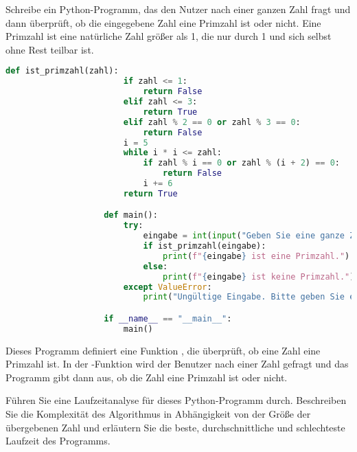 \documentclass[10pt]{article}
\begin{document}
    \spawncover

    \begin{task}[Primzahlüberprüfung]
        \begin{subtask}
            Schreibe ein Python-Programm, das den Nutzer nach einer ganzen Zahl fragt und dann überprüft, ob die eingegebene Zahl eine Primzahl ist oder nicht.
            Eine Primzahl ist eine natürliche Zahl grö{\ss}er als 1, die nur durch 1 und sich selbst ohne Rest teilbar ist.

            \begin{solution}
                \begin{lstlisting}[language= python]
                    def ist_primzahl(zahl):
                        if zahl <= 1:
                            return False
                        elif zahl <= 3:
                            return True
                        elif zahl % 2 == 0 or zahl % 3 == 0:
                            return False
                        i = 5
                        while i * i <= zahl:
                            if zahl % i == 0 or zahl % (i + 2) == 0:
                                return False
                            i += 6
                        return True

                    def main():
                        try:
                            eingabe = int(input("Geben Sie eine ganze Zahl ein: "))
                            if ist_primzahl(eingabe):
                                print(f"{eingabe} ist eine Primzahl.")
                            else:
                                print(f"{eingabe} ist keine Primzahl.")
                        except ValueError:
                            print("Ungültige Eingabe. Bitte geben Sie eine ganze Zahl ein.")

                    if __name__ == "__main__":
                        main()
                \end{lstlisting}
                Dieses Programm definiert eine Funktion , die überprüft, ob eine Zahl eine Primzahl ist.
                In der -Funktion wird der Benutzer nach einer Zahl gefragt und das Programm gibt dann aus, ob die Zahl eine Primzahl ist oder nicht.
            \end{solution}
        \end{subtask}

        \begin{subtask}
            Führen Sie eine Laufzeitanalyse für dieses Python-Programm durch.
            Beschreiben Sie die Komplexität des Algorithmus in Abhängigkeit von der Größe der übergebenen Zahl und erläutern Sie die beste, durchschnittliche und schlechteste Laufzeit des Programms.


\end{subtask}
\end{task}
\end{document}
